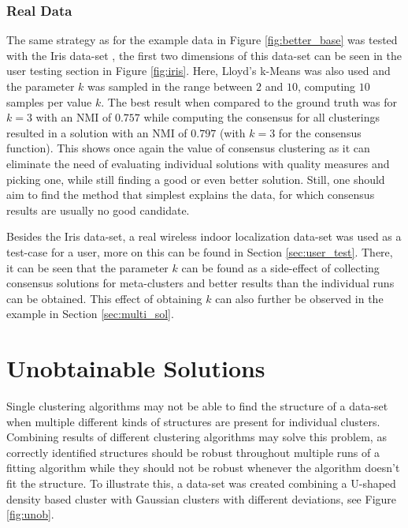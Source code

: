 \documentclass[
	a4paper,
	english,
	twoside,
	openright,               
	11pt                            
	]{report}
\begin{document}
\subsubsection{Real Data}

The same strategy as for the example data in Figure \ref{fig:better_base} was tested with the Iris data-set \cite{Dua:2019}, the first two dimensions of this data-set can be seen in the user testing section in Figure \ref{fig:iris}. Here, Lloyd's k-Means was also used and the parameter $k$ was sampled in the range between $2$ and $10$, computing $10$ samples per value $k$. The best result when compared to the ground truth was for $k=3$ with an NMI of $0.757$ while computing the consensus for all clusterings resulted in a solution with an NMI of $0.797$ (with $k=3$ for the consensus function). This shows once again the value of consensus clustering as it can eliminate the need of evaluating individual solutions with quality measures and picking one, while still finding a good or even better solution. Still, one should aim to find the method that simplest explains the data, for which consensus results are usually no good candidate. 

Besides the Iris data-set, a real wireless indoor localization data-set \cite{wireless} was used as a test-case for a user, more on this can be found in Section \ref{sec:user_test}. There, it can be seen that the parameter $k$ can be found as a side-effect of collecting consensus solutions for meta-clusters and better results than the individual runs can be obtained. This effect of obtaining $k$ can also further be observed in the example in Section \ref{sec:multi_sol}.

\section{Unobtainable Solutions}\label{sec:unob}
Single clustering algorithms may not be able to find the structure of a data-set when multiple different kinds of structures are present for individual clusters. Combining results of different clustering algorithms may solve this problem, as correctly identified structures should be robust throughout multiple runs of a fitting algorithm while they should not be robust whenever the algorithm doesn't fit the structure. To illustrate this, a data-set was created combining a U-shaped density based cluster with Gaussian clusters with different deviations, see Figure \ref{fig:unob}.
\end{document}
